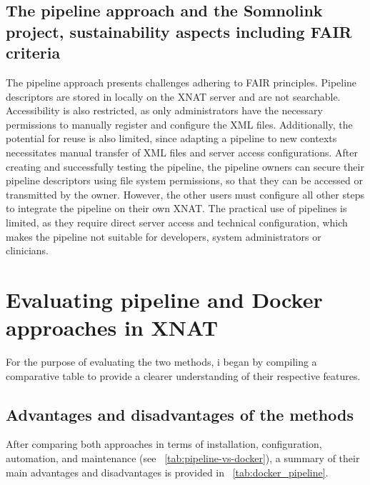 \subsection{The pipeline approach and the Somnolink project, sustainability aspects including FAIR criteria}
The pipeline approach presents challenges adhering to FAIR principles.
Pipeline descriptors are stored in locally on the XNAT server and are not searchable.
Accessibility is also restricted, as only administrators have the necessary permissions to manually register and configure the XML files.
Additionally, the potential for reuse is also limited, since adapting a pipeline to new contexts necessitates manual transfer of XML files and server access configurations. 
After creating and successfully testing the pipeline, the pipeline owners can secure their pipeline descriptors using file system permissions, so that they can be accessed or transmitted by the owner. However, the other users must configure all other steps to integrate the pipeline on their own XNAT.
The practical use of pipelines is limited, as they require direct server access and technical configuration, which makes the pipeline not suitable for developers, system administrators or clinicians.


\section{Evaluating pipeline and Docker approaches in XNAT}

For the purpose of evaluating the two methods, i began by compiling a comparative table to provide a clearer understanding of their respective features.

\subsection{Advantages and disadvantages of the methods}

After comparing both approaches in terms of installation, configuration, automation, and maintenance (see ~\autoref{tab:pipeline-vs-docker}), a summary of their main advantages and disadvantages is provided in ~\autoref{tab:docker_pipeline}.

